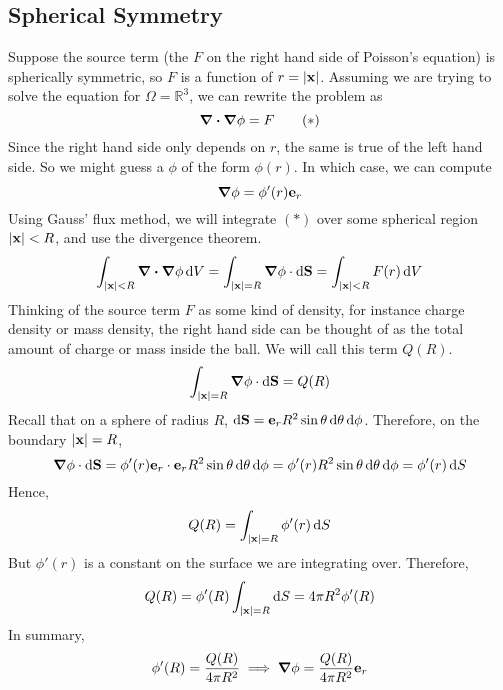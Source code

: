 \subsection{Spherical Symmetry}
Suppose the source term (the \(F\) on the right hand side of Poisson's equation) is spherically symmetric, so \(F\) is a function of \(r = \abs{\vb x}\). Assuming we are trying to solve the equation for \(\Omega = \mathbb R^3\), we can rewrite the problem as
\begin{equation}
	\div{\grad{\phi}} = F
	\tag{\(\ast\)}
\end{equation}
Since the right hand side only depends on \(r\), the same is true of the left hand side. So we might guess a \(\phi\) of the form \(\phi(r)\). In which case, we can compute
\[ \grad{\phi} = \phi'(r) \vb e_r \]
Using Gauss' flux method, we will integrate \((\ast)\) over some spherical region \(\abs{\vb x} < R\), and use the divergence theorem.
\[ \int_{\abs{\vb x} < R} \div{\grad{\phi}}\dd{V} = \int_{\abs{\vb x} = R} \grad{\phi} \cdot \dd{\vb S} = \int_{\abs{\vb x} < R} F(r) \dd{V} \]
Thinking of the source term \(F\) as some kind of density, for instance charge density or mass density, the right hand side can be thought of as the total amount of charge or mass inside the ball. We will call this term \(Q(R)\).
\[ \int_{\abs{\vb x} = R} \grad{\phi} \cdot \dd{\vb S} = Q(R) \]
Recall that on a sphere of radius \(R\), \(\dd{\vb S} = \vb e_r R^2 \sin\theta \dd{\theta}\dd{\phi}\). Therefore, on the boundary \(\abs{\vb x} = R\),
\[ \grad{\phi} \cdot \dd{\vb S} = \phi'(r) \vb e_r \cdot \vb e_r R^2 \sin\theta \dd{\theta}\dd{\phi} = \phi'(r) R^2 \sin\theta \dd{\theta}\dd{\phi} = \phi'(r) \dd{S} \]
Hence,
\[ Q(R) = \int_{\abs{\vb x} = R} \phi'(r) \dd{S} \]
But \(\phi'(r)\) is a constant on the surface we are integrating over. Therefore,
\[ Q(R) = \phi'(R) \int_{\abs{\vb x} = R} \dd{S} = 4\pi R^2 \phi'(R) \]
In summary,
\[ \phi'(R) = \frac{Q(R)}{4\pi R^2} \implies \grad{\phi} = \frac{Q(R)}{4\pi R^2} \vb e_r \]

